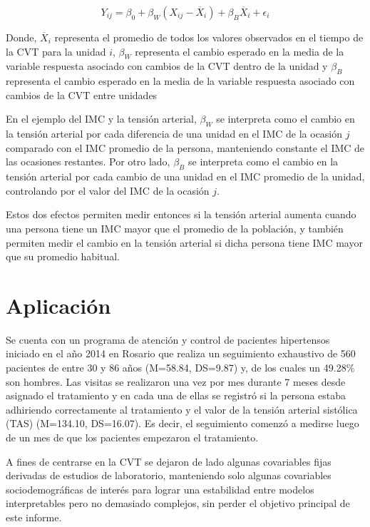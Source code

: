 \documentclass[spanish]{article}
\numberwithin{figure}{subsection}
\numberwithin{equation}{subsection}
\numberwithin{table}{subsection}
\def\npatients{560}
\begin{document}
\[ Y_{ij} = \beta_0 + \beta_W (X_{ij} - \overline{X}_i) + \beta_B \overline{X}_i + \epsilon_{i} \]

Donde, $\overline{X}_i$ representa el promedio de todos los valores observados
en el tiempo de la CVT para la unidad $i$, $\beta_W$ representa el cambio
esperado en la media de la variable respuesta asociado con cambios de la CVT
dentro de la unidad y $\beta_B$ representa el cambio esperado en la media de
la variable respuesta asociado con cambios de la CVT entre unidades

En el ejemplo del IMC y la tensión arterial, $\beta_W$ se interpreta como el
cambio en la tensión arterial por cada diferencia de una unidad en el IMC de la
ocasión $j$ comparado con el IMC promedio de la persona, manteniendo constante
el IMC de las ocasiones restantes. Por otro lado, $\beta_B$ se interpreta como
el cambio en la tensión arterial por cada cambio de una unidad en el IMC
promedio de la unidad, controlando por el valor del IMC de la ocasión $j$.

Estos dos efectos permiten medir entonces si la tensión arterial aumenta cuando
una persona tiene un IMC mayor que el promedio de la población, y también
permiten medir el cambio en la tensión arterial si dicha persona tiene IMC mayor
que su promedio habitual.

\newpage

\section{Aplicación}

Se cuenta con un programa de atención y control de pacientes hipertensos
iniciado en el año 2014 en Rosario que realiza un seguimiento exhaustivo de
\npatients{} pacientes de entre 30 y 86 años (M=58.84, DS=9.87) y, de los cuales
un 49.28\% son hombres. Las visitas se realizaron una vez por mes durante 7
meses desde asignado el tratamiento y en cada una de ellas se registró si la
persona estaba adhiriendo correctamente al tratamiento y el valor de la tensión
arterial sistólica (TAS) (M=134.10, DS=16.07). Es decir, el seguimiento comenzó
a medirse luego de un mes de que los pacientes empezaron el tratamiento.

A fines de centrarse en la CVT se dejaron de lado algunas covariables fijas
derivadas de estudios de laboratorio, manteniendo solo algunas covariables
sociodemográficas de interés para lograr una estabilidad entre modelos
interpretables pero no demasiado complejos, sin perder el objetivo principal de
este informe.
\end{document}
